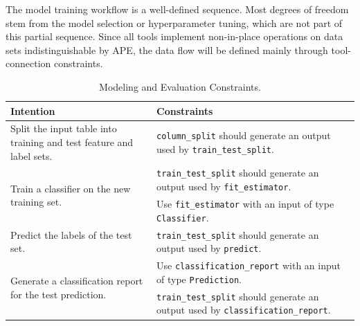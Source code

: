 The model training workflow is a well-defined sequence. Most degrees of freedom stem from the model selection or hyperparameter tuning, which are not part of this partial sequence. Since all tools implement non-in-place operations on data sets indistinguishable by APE, the data flow will be defined mainly through tool-connection constraints.
\begin{table}[h]
\centering
\footnotesize
\begin{tabular}{|p{}|p{}|}
\hline
\textbf{Intention} & \textbf{Constraints} \\
\hline
Split the input table into training and test feature and label sets. & \texttt{column\_split} should generate an output used by \texttt{train\_test\_split}. \\
\hline
\multirow{2}{=}{Train a classifier on the new training set.} & \texttt{train\_test\_split} should generate an output used by \texttt{fit\_estimator}. \\
\cline{2-2}
& Use \texttt{fit\_estimator} with an input of type \texttt{Classifier}. \\
\hline
Predict the labels of the test set. & \texttt{train\_test\_split} should generate an output used by \texttt{predict}. \\
\hline
\multirow{2}{=}{Generate a classification report for the test prediction.} & Use \texttt{classification\_report} with an input of type \texttt{Prediction}. \\
\cline{2-2}
& \texttt{train\_test\_split} should generate an output used by \texttt{classification\_report}. \\
\hline
\end{tabular}
\caption{Modeling and Evaluation Constraints.}
\label{table:native_ape_modeling_constraints}
\end{table}

